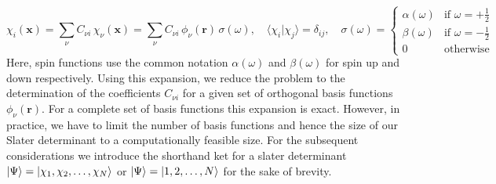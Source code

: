 \begin{equation} %
  \label{eq:spin_orbital_expansion}
  \chi_i(\mathbf x) = \sum_{\nu} C_{\nu i}\,\chi_\nu(\mathbf x) = \sum_{\nu} C_{\nu i}\,\phi_\nu(\mathbf r)\,\sigma(\omega), \quad
  \langle\chi_i|\chi_j\rangle = \delta_{ij},  \quad
  \sigma(\omega) =
    \begin{cases}
      \alpha(\omega)&\text{if }\omega=+\tfrac12\\
      \beta(\omega)&\text{if }\omega=-\tfrac12\\
      0&\text{otherwise}
    \end{cases}
\end{equation}
Here, spin functions use the common notation $\alpha(\omega)$ and $\beta(\omega)$ for spin up and down respectively.
Using this expansion, we reduce the problem to the determination of the coefficients $C_{\nu i}$ for a given set of orthogonal basis functions $\phi_\nu(\mathbf{r})$. For a complete set of basis functions this expansion is exact. However, in practice, we have to limit the number of basis functions and hence the size of our Slater determinant to a computationally feasible size. For the subsequent considerations we introduce the shorthand ket for a slater determinant $\ket{\Psi} = \ket{\chi_1, \chi_2, \ldots, \chi_N}$ or $\ket{\Psi} = \ket{1, 2, \ldots, N}$ for the sake of brevity.

